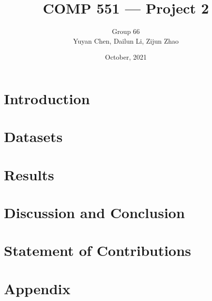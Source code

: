 \documentclass[11pt,twocolumn,letterpaper]{article}
\title{COMP 551 --- Project 2}
\date{October, 2021}
\author{Group 66\\\small{Yuyan Chen, Dailun Li, Zijun Zhao}}
\begin{document}
\maketitle

\begin{abstract}
	
\end{abstract}

\section{Introduction}

\section{Datasets}

\section{Results}

\section{Discussion and Conclusion}

\section*{Statement of Contributions}

\begin{thebibliography}{99}
\end{thebibliography}

\section*{Appendix}
	
\end{document}
